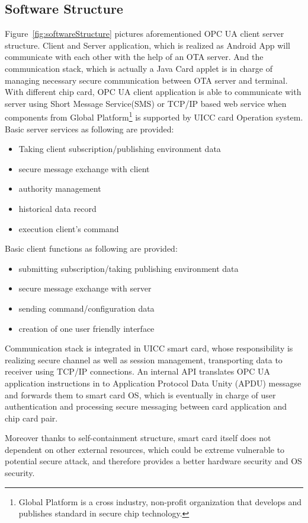\documentclass[]{llncs}
\begin{document}
\subsection {Software Structure}
Figure~\ref{fig:softwareStructure} pictures aforementioned OPC UA client server structure. Client and Server application, which is realized as Android App will communicate with each other with the help of an OTA server. And the communication  stack, which is actually a Java Card applet is in charge of managing necessary  secure communication between OTA server and terminal. With different chip card, OPC UA client application is able to communicate with server using Short Message Service(SMS) or TCP/IP based web service when components from Global Platform\footnote{Global Platform is a cross industry, non-profit organization that develops and publishes standard in secure chip technology.} is supported by UICC card Operation system. 
Basic server services as following are provided:
 \begin{itemize}
  \item Taking client subscription/publishing environment data
  \item secure message exchange with client
  \item authority management
  \item historical data record
  \item execution client's command
\end{itemize}
Basic client functions as following are provided:
 \begin{itemize}
  \item submitting subscription/taking publishing environment data
  \item secure message exchange with server
  \item sending command/configuration data
  \item creation of one user friendly interface
\end{itemize}

Communication stack is integrated  in UICC smart card, whose responsibility is realizing secure channel as well as session management, transporting data to receiver using TCP/IP connections. An internal API translates OPC UA application instructions in to Application Protocol Data Unity (APDU) messagse and forwards them to smart card OS, which is eventually in charge of user authentication and processing secure messaging between card application and chip card pair. 

Moreover thanks to self-containment structure, smart card itself does not dependent on other external resources, which could be extreme vulnerable to potential secure attack, and therefore provides a better hardware security and OS security.
\end{document}
